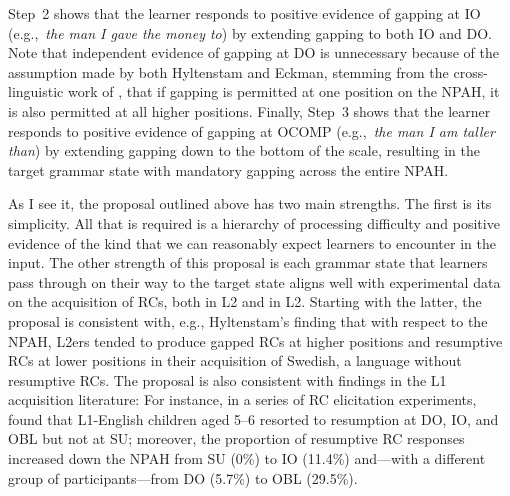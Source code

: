 Step~2 shows that the learner responds to positive evidence of gapping at IO (e.g.,~\textit{the man I gave the money to}) by extending gapping to both IO and DO. Note that independent evidence of gapping at DO is unnecessary because of the assumption made by both Hyltenstam and Eckman, stemming from the cross-linguistic work of \textcite{keenan.comrie1977}, that if gapping is permitted at one position on the NPAH, it is also permitted at all higher positions. Finally, Step~3 shows that the learner responds to positive evidence of gapping at OCOMP (e.g.,~\textit{the man I am taller than}) by extending gapping down to the bottom of the scale, resulting in the target grammar state with mandatory gapping across the entire NPAH.

As I see it, the proposal outlined above has two main strengths. The first is its simplicity. All that is required is a hierarchy of processing difficulty and positive evidence of the kind that we can reasonably expect learners to encounter in the input. The other strength of this proposal is each grammar state that learners pass through on their way to the target state aligns well with experimental data on the acquisition of RCs, both in L2 and in L2. Starting with the latter, the proposal is consistent with, e.g., Hyltenstam's finding that with respect to the NPAH, L2ers tended to produce gapped RCs at higher positions and resumptive RCs at lower positions in their acquisition of Swedish, a language without resumptive RCs. The proposal is also consistent with findings in the L1 acquisition literature: For instance, in a series of RC elicitation experiments, \textcite{kim2013} found that L1-English children aged 5--6 resorted to resumption at DO, IO, and OBL but not at SU; moreover, the proportion of resumptive RC responses increased down the NPAH from SU (0\%) to IO (11.4\%) and---with a different group of participants---from DO (5.7\%) to OBL (29.5\%).

